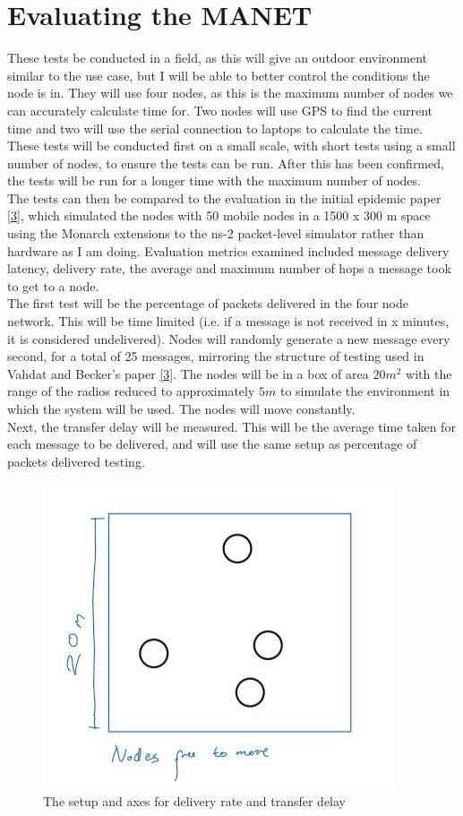 \documentclass[10pt, a4paper]{article}
\begin{document}
\section*{Evaluating the MANET}
These tests be conducted in a field, as this will give an outdoor environment similar to the use case, but I will be able to better control the conditions the node is in. They will use four nodes, as this is the maximum number of nodes we can accurately calculate time for. Two nodes will use GPS to find the current time and two will use the serial connection to laptops to calculate the time. These tests will be conducted first on a small scale, with short tests using a small number of nodes, to ensure the tests can be run. After this has been confirmed, the tests will be run for a longer time with the maximum number of nodes. \\ 
The tests can then be compared to the evaluation in the initial epidemic paper \hyperref[epidemic]{[3]}, which simulated the nodes with 50 mobile nodes in a 1500 x 300 m space using the Monarch extensions to the ns-2 packet-level simulator rather than hardware as I am doing. Evaluation metrics examined included message delivery latency, delivery rate, the average and maximum number of hops a message took to get to a node.\\ 
The first test will be the percentage of packets delivered in the four node network. This will be time limited (i.e. if a message is not received in x minutes, it is considered undelivered). Nodes will randomly generate a new message every second, for a total of 25 messages, mirroring the structure of testing used in Vahdat and Becker's paper \hyperref[epidemic]{[3]}. The nodes will be in a box of area $20m^2$ with the range of the radios reduced to approximately $5m$ to simulate the environment in which the system will be used. The nodes will move constantly. \\ 
Next, the transfer delay will be measured. This will be the average time taken for each message to be delivered, and will use the same setup as percentage of packets delivered testing.

\begin{figure}[h]
\caption{The setup and axes for delivery rate and transfer delay}
\begin{center}
\includegraphics[scale=0.5]{transfer.jpg}
\end{center}
\end{figure}
\end{document}
